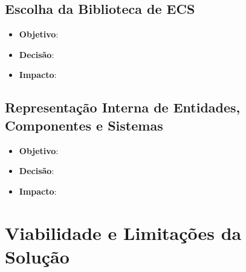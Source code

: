 \subsection{Escolha da Biblioteca de ECS}

\begin{itemize}
	\item \textbf{Objetivo}:
	\item \textbf{Decisão}:
	\item \textbf{Impacto}:
\end{itemize}

\subsection{Representação Interna de Entidades, Componentes e Sistemas}

\begin{itemize}
	\item \textbf{Objetivo}:
	\item \textbf{Decisão}:
	\item \textbf{Impacto}:
\end{itemize}

\section{Viabilidade e Limitações da Solução}
